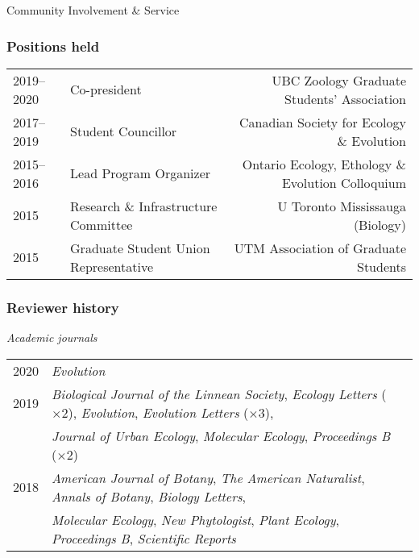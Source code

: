 \documentclass[11pt]{article}
\begin{document}
\noindent \begin{rSection}{Community Involvement \& Service}
\noindent

\subsubsection*{Positions held}
\begin{tabular}{llr}
2019--2020 & Co-president & UBC Zoology Graduate Students' Association\\ 
2017--2019 & Student Councillor & Canadian Society for Ecology \& Evolution\\
2015--2016 & Lead Program Organizer & Ontario Ecology, Ethology \& Evolution Colloquium\\
2015 & Research \& Infrastructure Committee & U Toronto Mississauga (Biology)\\
2015 & Graduate Student Union Representative &  UTM Association of Graduate Students\\
\end{tabular}
\vspace{0.5em}

\subsubsection*{Reviewer history}

\noindent \textit{Academic journals}
\vspace{0.5em}

\begin{tabular}{llr}

2020 & \textit{Evolution}\\

2019 & \textit{Biological Journal of the Linnean Society}, \textit{Ecology Letters} ($\times$2), \textit{Evolution}, \textit{Evolution Letters} ($\times$3), \\ 
& \textit{Journal of Urban Ecology}, \textit{Molecular Ecology}, \textit{Proceedings B} ($\times$2)\\

2018 & \textit{American Journal of Botany}, \textit{The American Naturalist}, \textit{Annals of Botany}, \textit{Biology Letters},\\
&  \textit{Molecular Ecology}, \textit{New Phytologist}, \textit{Plant Ecology}, \textit{Proceedings B}, \textit{Scientific Reports}\\


\end{tabular}
\end{rSection}
\end{document}
